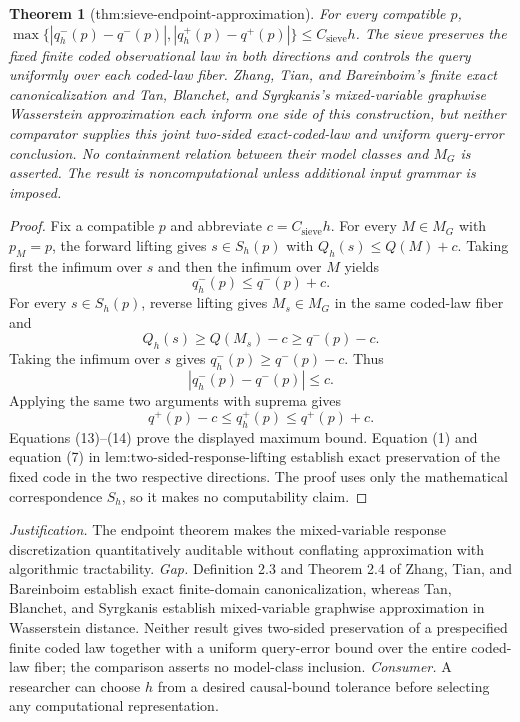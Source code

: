 \documentclass{article}
\newtheorem{theorem}{Theorem}
\begin{document}
\begin{theorem}[thm:sieve-endpoint-approximation]\label{thm:sieve-endpoint-approximation}
For every compatible \(p\), \(\max\{|q_h^-(p)-q^-(p)|,|q_h^+(p)-q^+(p)|\}\le C_{\mathrm{sieve}}h\). The sieve preserves the fixed finite coded observational law in both directions and controls the query uniformly over each coded-law fiber. Zhang, Tian, and Bareinboim's finite exact canonicalization and Tan, Blanchet, and Syrgkanis's mixed-variable graphwise Wasserstein approximation each inform one side of this construction, but neither comparator supplies this joint two-sided exact-coded-law and uniform query-error conclusion. No containment relation between their model classes and \(M_G\) is asserted. The result is noncomputational unless additional input grammar is imposed.
\end{theorem}
\begin{proof}
Fix a compatible \(p\) and abbreviate \(c=C_{\mathrm{sieve}}h\).  For every \(M\in M_G\) with \(p_M=p\), the forward lifting gives \(s\in S_h(p)\) with \(Q_h(s)\leq Q(M)+c\).  Taking first the infimum over \(s\) and then the infimum over \(M\) yields
\[
q_h^-(p)\leq q^-(p)+c.                                           \tag{12}
\]
For every \(s\in S_h(p)\), reverse lifting gives \(M_s\in M_G\) in the same coded-law fiber and
\[
Q_h(s)\geq Q(M_s)-c\geq q^-(p)-c.
\]
Taking the infimum over \(s\) gives \(q_h^-(p)\geq q^-(p)-c\).  Thus
\[
|q_h^-(p)-q^-(p)|\leq c.                                         \tag{13}
\]
Applying the same two arguments with suprema gives
\[
q^+(p)-c\leq q_h^+(p)\leq q^+(p)+c.                             \tag{14}
\]
Equations (13)--(14) prove the displayed maximum bound.  Equation (1) and equation (7) in \(\text{lem:two-sided-response-lifting}\) establish exact preservation of the fixed code in the two respective directions.  The proof uses only the mathematical correspondence \(S_h\), so it makes no computability claim.
\end{proof}
\par\smallskip\noindent \textit{Justification.} The endpoint theorem makes the mixed-variable response discretization quantitatively auditable without conflating approximation with algorithmic tractability. \textit{Gap.} Definition 2.3 and Theorem 2.4 of Zhang, Tian, and Bareinboim establish exact finite-domain canonicalization, whereas Tan, Blanchet, and Syrgkanis establish mixed-variable graphwise approximation in Wasserstein distance. Neither result gives two-sided preservation of a prespecified finite coded law together with a uniform query-error bound over the entire coded-law fiber; the comparison asserts no model-class inclusion. \textit{Consumer.} A researcher can choose \(h\) from a desired causal-bound tolerance before selecting any computational representation.
\end{document}
